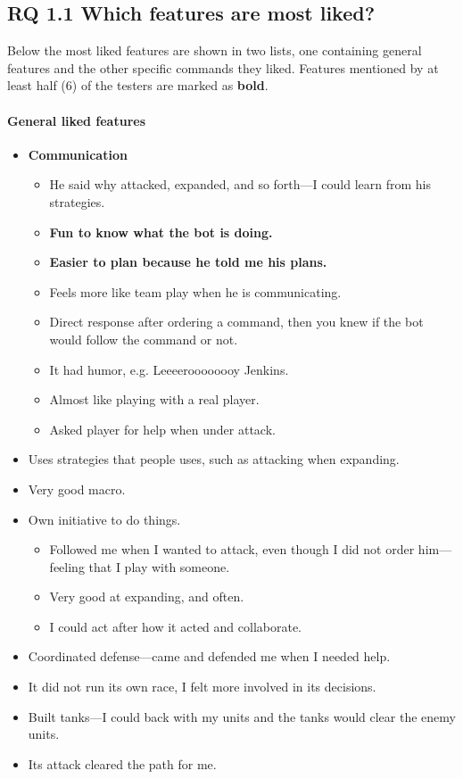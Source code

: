 \subsection{RQ 1.1 Which features are most liked?}
Below the most liked features are shown in two lists, one containing general features and the other specific commands they liked. Features mentioned by at least half (6) of the testers are marked as \textbf{bold}.
\paragraph{General liked features}
\begin{itemize}
	\item \textbf{Communication}
	\begin{itemize}
		\item He said why attacked, expanded, and so forth—I could learn from his strategies.
		\item \textbf{Fun to know what the bot is doing.}
		\item \textbf{Easier to plan because he told me his plans.}
		\item Feels more like team play when he is communicating.
		\item Direct response after ordering a command, then you knew if the bot would follow the command or not.
		\item It had humor, e.g. Leeeeroooooooy Jenkins.
		\item Almost like playing with a real player.
		\item Asked player for help when under attack.
	\end{itemize}
	\item Uses strategies that people uses, such as attacking when expanding.
	\item Very good macro.
	\item Own initiative to do things.
	\begin{itemize}
		\item Followed me when I wanted to attack, even though I did not order him—feeling that I play with someone.
		\item Very good at expanding, and often.
		\item I could act after how it acted and collaborate.
	\end{itemize}
	\item Coordinated defense—came and defended me when I needed help.
	\item It did not run its own race, I felt more involved in its decisions.
	\item Built tanks—I could back with my units and the tanks would clear the enemy units.
	\item Its attack cleared the path for me.
\end{itemize}

